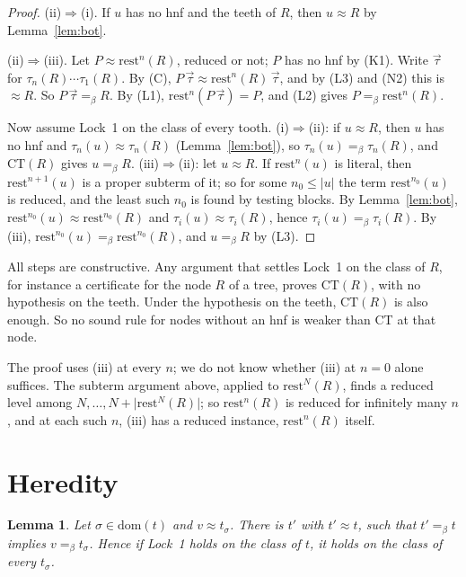 \documentclass[11pt]{amsart}
\newtheorem{lemma}[theorem]{Lemma}
\theoremstyle{definition}
\newcommand{\conv}{=_\beta}
\newcommand{\sz}[1]{\lvert#1\rvert}
\newcommand{\rest}{\mathrm{rest}}
\newcommand{\dom}{\mathrm{dom}}
\newcommand{\CT}{\mathrm{CT}}
\begin{document}
\begin{proof}
(ii)$\Rightarrow$(i). If $u$ has no hnf and the teeth of $R$, then $u\approx R$ by Lemma~\ref{lem:bot}.

(ii)$\Rightarrow$(iii). Let $P\approx\rest^n(R)$, reduced or not; $P$ has no hnf by (K1). Write
$\vec\tau$ for $\tau_n(R)\cdots\tau_1(R)$. By (C), $P\,\vec\tau\approx\rest^n(R)\,\vec\tau$, and by
(L3) and (N2) this is $\approx R$. So $P\,\vec\tau\conv R$. By (L1), $\rest^n(P\,\vec\tau)=P$, and
(L2) gives $P\conv\rest^n(R)$.

Now assume Lock~1 on the class of every tooth. (i)$\Rightarrow$(ii): if $u\approx R$, then $u$ has no hnf
and $\tau_n(u)\approx\tau_n(R)$ (Lemma~\ref{lem:bot}), so $\tau_n(u)\conv\tau_n(R)$, and $\CT(R)$
gives $u\conv R$. (iii)$\Rightarrow$(ii): let $u\approx R$. If $\rest^n(u)$ is literal, then
$\rest^{n+1}(u)$ is a proper subterm of it; so for some $n_0\le\sz u$ the term $\rest^{n_0}(u)$ is
reduced, and the least such $n_0$ is found by testing blocks. By Lemma~\ref{lem:bot},
$\rest^{n_0}(u)\approx\rest^{n_0}(R)$ and $\tau_i(u)\approx\tau_i(R)$, hence $\tau_i(u)\conv\tau_i(R)$.
By (iii), $\rest^{n_0}(u)\conv\rest^{n_0}(R)$, and $u\conv R$ by (L3).
\end{proof}

All steps are constructive. Any argument that settles Lock~1 on the class of $R$, for instance a
certificate for the node $R$ of a tree, proves $\CT(R)$, with no hypothesis on the teeth. Under the
hypothesis on the teeth, $\CT(R)$ is also enough. So no sound rule for nodes without an hnf is
weaker than CT at that node.

The proof uses (iii) at every $n$; we do not know whether (iii) at $n=0$ alone suffices. The
subterm argument above, applied to $\rest^N(R)$, finds a reduced level among
$N,\dots,N+\sz{\rest^N(R)}$; so $\rest^n(R)$ is reduced for infinitely many $n$, and at each such
$n$, (iii) has a reduced instance, $\rest^n(R)$ itself.

\section{Heredity}\label{sec:her}

\begin{lemma}\label{lem:replace}
Let $\sigma\in\dom(t)$ and $v\approx t_\sigma$. There is $t'$ with $t'\approx t$, such that
$t'\conv t$ implies $v\conv t_\sigma$. Hence if Lock~1 holds on the class of $t$, it holds on the class
of every $t_\sigma$.
\end{lemma}
\end{document}

